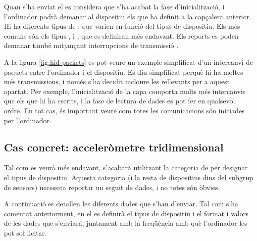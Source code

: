 Quan s'ha enviat el  es considera que
s'ha acabat la fase d'inicialització, i l'ordinador podrà demanar al
dispositiu els  que ha definit a la capçalera anterior.
Hi ha diferents tipus de , que varien en funció del tipus de
dispositiu. Els més comuns són els tipus ,  i ,
que es definiran més endavant. Els reports es poden demanar també mitjançant
interrupcions de transmissió .

A la figura \ref{fig:hid-packets} es pot veure un exemple simplificat d'un
intercanvi de paquets entre l'ordinador i el dispositiu. Es diu simplificat
perquè hi ha moltes més transmissions, i només s'ha decidit incloure les
rellevants per a aquest apartat. Per exemple, l'inicialització de la capa
 comporta molts més intercanvis que els que hi ha escrits, i la fase
de lectura de dades es pot fer en qualsevol ordre. En tot cas, és important
veure com totes les comunicacions són iniciades per l'ordinador.



\subsection{Cas concret: acceleròmetre tridimensional}

Tal com es veurà més endavant, s'acabarà utilitzant la categoria de
 per designar el tipus de dispositiu. Aquesta
categoria (i la resta de dispositius dins del subgrup de sensors) necessita
reportar un seguit de dades, i no totes són òbvies.

A continuació es detallen les diferents dades que s'han d'enviar. Tal com s'ha
comentat anteriorment, en el  es definirà
el tipus de dispositiu i el format i valors de les dades que s'enviarà, juntament
amb la freqüència amb què l'ordinador les pot so\l.licitar.

